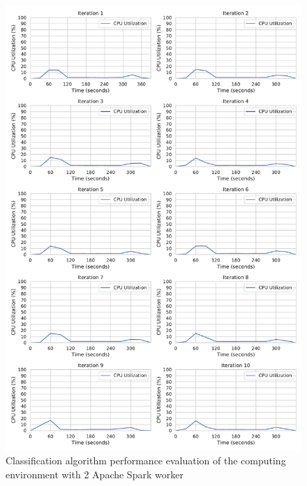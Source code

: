 \begin{figure}[h]
\centering
\includegraphics[scale=0.4]{images/07_evaluation/taxi/taxi_2_worker_cpu_performance}
\caption{Classification algorithm performance evaluation of the computing environment with 2 Apache Spark worker}
\label{fig:07_mortgage_static-cpu_results}
\end{figure}

